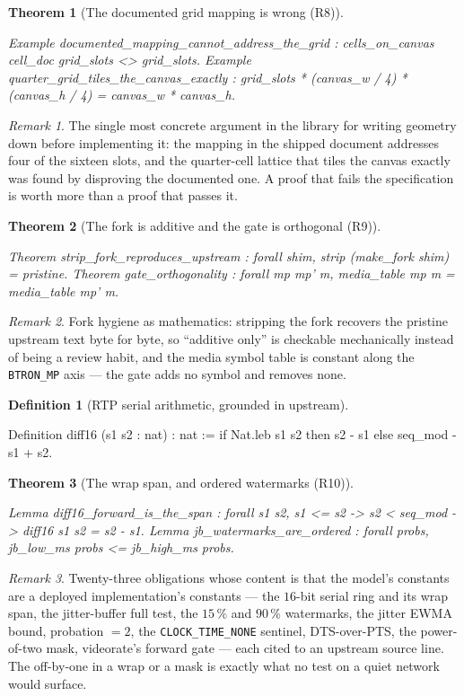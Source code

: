 \documentclass[10pt,journal,compsoc,twocolumn]{article}
\newtheorem{theorem}{Theorem}[section]
\theoremstyle{definition}
\newtheorem{definition}{Definition}[section]
\theoremstyle{remark}
\newtheorem{remark}{Remark}[section]
\theoremstyle{plain}
\newcommand{\ctr}[1]{\texttt{#1}}
\begin{document}
\begin{theorem}[The documented grid mapping is wrong (R8)]
\begin{coc}
Example documented_mapping_cannot_address_the_grid :
  cells_on_canvas cell_doc grid_slots <> grid_slots.
Example quarter_grid_tiles_the_canvas_exactly :
  grid_slots * (canvas_w / 4) * (canvas_h / 4) = canvas_w * canvas_h.
\end{coc}\end{theorem}
\begin{remark}
The single most concrete argument in the library for writing geometry down
before implementing it: the mapping in the shipped document addresses four of
the sixteen slots, and the quarter-cell lattice that tiles the canvas exactly was
found by disproving the documented one. A proof that fails the specification is
worth more than a proof that passes it.
\end{remark}

\begin{theorem}[The fork is additive and the gate is orthogonal (R9)]
\begin{coc}
Theorem strip_fork_reproduces_upstream : forall shim, strip (make_fork shim) = pristine.
Theorem gate_orthogonality : forall mp mp' m, media_table mp m = media_table mp' m.
\end{coc}\end{theorem}
\begin{remark}
Fork hygiene as mathematics: stripping the fork recovers the pristine upstream
text byte for byte, so ``additive only'' is checkable mechanically instead of
being a review habit, and the media symbol table is constant along the
\ctr{BTRON\_MP} axis --- the gate adds no symbol and removes none.
\end{remark}

\begin{definition}[RTP serial arithmetic, grounded in upstream]
\begin{coc}
Definition diff16 (s1 s2 : nat) : nat :=
  if Nat.leb s1 s2 then s2 - s1 else seq_mod - s1 + s2.
\end{coc}\end{definition}
\begin{theorem}[The wrap span, and ordered watermarks (R10)]
\begin{coc}
Lemma diff16_forward_is_the_span : forall s1 s2,
  s1 <= s2 -> s2 < seq_mod -> diff16 s1 s2 = s2 - s1.
Lemma jb_watermarks_are_ordered : forall probs, jb_low_ms probs <= jb_high_ms probs.
\end{coc}\end{theorem}
\begin{remark}
Twenty-three obligations whose content is that the model's constants are a
deployed implementation's constants --- the \(16\)-bit serial ring and its wrap
span, the jitter-buffer full test, the \(15\,\%\) and \(90\,\%\) watermarks, the
jitter EWMA bound, probation \(=2\), the \ctr{CLOCK\_TIME\_NONE} sentinel,
DTS-over-PTS, the power-of-two mask, videorate's forward gate --- each cited to
an upstream source line. The off-by-one in a wrap or a mask is exactly what no
test on a quiet network would surface.
\end{remark}
\end{document}
